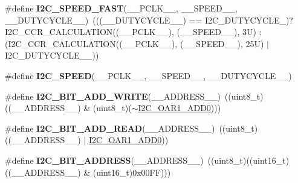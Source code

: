 \begin{DoxyCompactItemize}
\item 
\mbox{\label{group___i2_c___private___macros_ga9e5a85344d70ab05020e41ba24566f57}} 
\#define {\bfseries I2\+C\+\_\+\+S\+P\+E\+E\+D\+\_\+\+F\+A\+ST}(\+\_\+\+\_\+\+P\+C\+L\+K\+\_\+\+\_\+,  \+\_\+\+\_\+\+S\+P\+E\+E\+D\+\_\+\+\_\+,  \+\_\+\+\_\+\+D\+U\+T\+Y\+C\+Y\+C\+L\+E\+\_\+\+\_\+)~(((\+\_\+\+\_\+\+D\+U\+T\+Y\+C\+Y\+C\+L\+E\+\_\+\+\_\+) == I2\+C\+\_\+\+D\+U\+T\+Y\+C\+Y\+C\+L\+E\+\_)? I2\+C\+\_\+\+C\+C\+R\+\_\+\+C\+A\+L\+C\+U\+L\+A\+T\+I\+ON((\+\_\+\+\_\+\+P\+C\+L\+K\+\_\+\+\_\+), (\+\_\+\+\_\+\+S\+P\+E\+E\+D\+\_\+\+\_\+), 3\+U) \+: (\+I2\+C\+\_\+\+C\+C\+R\+\_\+\+C\+A\+L\+C\+U\+L\+A\+T\+I\+O\+N((\+\_\+\+\_\+\+P\+C\+L\+K\+\_\+\+\_\+), (\+\_\+\+\_\+\+S\+P\+E\+E\+D\+\_\+\+\_\+), 25\+U) $\vert$ I2\+C\+\_\+\+D\+U\+T\+Y\+C\+Y\+C\+L\+E\+\_\+\_))
\item 
\#define {\bfseries I2\+C\+\_\+\+S\+P\+E\+ED}(\+\_\+\+\_\+\+P\+C\+L\+K\+\_\+\+\_\+,  \+\_\+\+\_\+\+S\+P\+E\+E\+D\+\_\+\+\_\+,  \+\_\+\+\_\+\+D\+U\+T\+Y\+C\+Y\+C\+L\+E\+\_\+\+\_\+)
\item 
\mbox{\label{group___i2_c___private___macros_gad83949bd18eca67258b05763a90d0128}} 
\#define {\bfseries I2\+C\+\_\+B\+I\+T\+\_\+\+A\+D\+D\+\_\+\+W\+R\+I\+TE}(\+\_\+\+\_\+\+A\+D\+D\+R\+E\+S\+S\+\_\+\+\_\+)~((uint8\+\_\+t)((\+\_\+\+\_\+\+A\+D\+D\+R\+E\+S\+S\+\_\+\+\_\+) \& (uint8\+\_\+t)($\sim$\hyperlink{group___peripheral___registers___bits___definition_ga8b7c20c81f79d17921718412b8fca6d7}{I2\+C\+\_\+\+O\+A\+R1\+\_\+\+A\+D\+D0})))
\item 
\mbox{\label{group___i2_c___private___macros_gacec6f0d6fde48a24327d2db15387fed8}} 
\#define {\bfseries I2\+C\+\_\+B\+I\+T\+\_\+\+A\+D\+D\+\_\+\+R\+E\+AD}(\+\_\+\+\_\+\+A\+D\+D\+R\+E\+S\+S\+\_\+\+\_\+)~((uint8\+\_\+t)((\+\_\+\+\_\+\+A\+D\+D\+R\+E\+S\+S\+\_\+\+\_\+) $\vert$ \hyperlink{group___peripheral___registers___bits___definition_ga8b7c20c81f79d17921718412b8fca6d7}{I2\+C\+\_\+\+O\+A\+R1\+\_\+\+A\+D\+D0}))
\item 
\mbox{\label{group___i2_c___private___macros_ga51ad2b93ef13577d3d437507e09191cd}} 
\#define {\bfseries I2\+C\+\_\+B\+I\+T\+\_\+\+A\+D\+D\+R\+E\+SS}(\+\_\+\+\_\+\+A\+D\+D\+R\+E\+S\+S\+\_\+\+\_\+)~((uint8\+\_\+t)((uint16\+\_\+t)((\+\_\+\+\_\+\+A\+D\+D\+R\+E\+S\+S\+\_\+\+\_\+) \& (uint16\+\_\+t)0x00\+F\+F)))

\end{DoxyCompactItemize}
